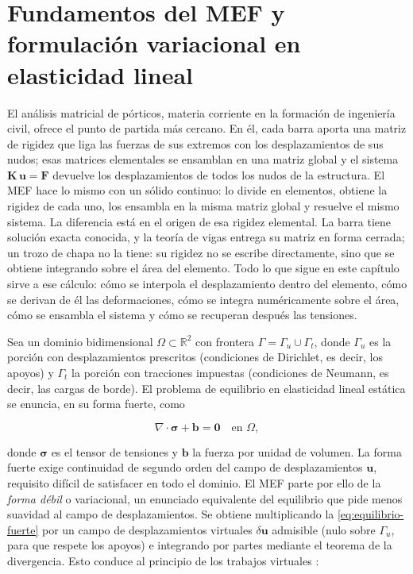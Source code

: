 \section{Fundamentos del MEF y formulación variacional en elasticidad lineal}
\label{sec:formulacion-debil}

El análisis matricial de pórticos, materia corriente en la formación de ingeniería civil, ofrece el punto de partida más cercano. En él, cada barra aporta una matriz de rigidez que liga las fuerzas de sus extremos con los desplazamientos de sus nudos; esas matrices elementales se ensamblan en una matriz global y el sistema $\bm{K}\,\bm{u} = \bm{F}$ devuelve los desplazamientos de todos los nudos de la estructura. El MEF hace lo mismo con un sólido continuo: lo divide en elementos, obtiene la rigidez de cada uno, los ensambla en la misma matriz global y resuelve el mismo sistema. La diferencia está en el origen de esa rigidez elemental. La barra tiene solución exacta conocida, y la teoría de vigas entrega su matriz en forma cerrada; un trozo de chapa no la tiene: su rigidez no se escribe directamente, sino que se obtiene integrando sobre el área del elemento. Todo lo que sigue en este capítulo sirve a ese cálculo: cómo se interpola el desplazamiento dentro del elemento, cómo se derivan de él las deformaciones, cómo se integra numéricamente sobre el área, cómo se ensambla el sistema y cómo se recuperan después las tensiones.

Sea un dominio bidimensional $\Omega \subset \mathbb{R}^2$ con frontera $\Gamma = \Gamma_u \cup \Gamma_t$, donde $\Gamma_u$ es la porción con desplazamientos prescritos (condiciones de Dirichlet, es decir, los apoyos) y $\Gamma_t$ la porción con tracciones impuestas (condiciones de Neumann, es decir, las cargas de borde). El problema de equilibrio en elasticidad lineal estática se enuncia, en su forma fuerte, como

\begin{equation}
\nabla \cdot \bm{\sigma} + \bm{b} = \bm{0} \quad \text{en } \Omega,
\label{eq:equilibrio-fuerte}
\end{equation}

donde $\bm{\sigma}$ es el tensor de tensiones y $\bm{b}$ la fuerza por unidad de volumen. La forma fuerte exige continuidad de segundo orden del campo de desplazamientos $\bm{u}$, requisito difícil de satisfacer en todo el dominio. El MEF parte por ello de la \emph{forma débil} o variacional, un enunciado equivalente del equilibrio que pide menos suavidad al campo de desplazamientos. Se obtiene multiplicando la \autoref{eq:equilibrio-fuerte} por un campo de desplazamientos virtuales $\delta\bm{u}$ admisible (nulo sobre $\Gamma_u$, para que respete los apoyos) e integrando por partes mediante el teorema de la divergencia. Esto conduce al principio de los trabajos virtuales \autocites[pp.~69-71]{zienkiewicz2013fem}[pp.~77-79]{hughes2000fem}[pp.~612-613]{reddy2006introduction}:


